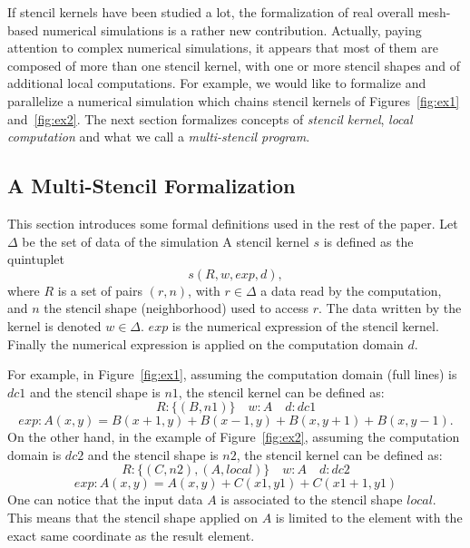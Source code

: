 If stencil kernels have been studied a lot, the formalization of real overall mesh-based numerical simulations is a rather new contribution. Actually, paying attention to complex numerical simulations, it appears that most of them are composed of more than one stencil kernel, with one or more stencil shapes and of additional local computations. For example, we would like to formalize and parallelize a numerical simulation which chains stencil kernels of Figures~\ref{fig:ex1} and~\ref{fig:ex2}. The next section formalizes concepts of \emph{stencil kernel}, \emph{local computation} and what we call a \emph{multi-stencil program}.

\subsection{A Multi-Stencil Formalization}
\label{sect:multistencil}
This section introduces some formal definitions used in the rest of the paper.
Let $\Delta$ be the set of data of the simulation
A stencil kernel $s$ is defined as the quintuplet
\begin{equation} 
s(R,w,exp,d),
\label{eq:st}
\end{equation}
where $R$ is a set of pairs $(r,n)$, with $r \in \Delta$ a data read by the computation, and $n$ the stencil shape (neighborhood) used to access $r$. The data written by the kernel is denoted $w \in \Delta$. $exp$ is the numerical expression of the stencil kernel. Finally the numerical expression is applied on the computation domain $d$.

For example, in Figure~\ref{fig:ex1}, assuming the computation domain (full lines) is $dc1$ and the stencil shape is $n1$, the stencil kernel can be defined as:
\begin{equation*}
R: \{(B,n1)\} \quad w: A \quad d: dc1
\end{equation*}
\begin{equation*}
exp: A(x,y)=B(x+1,y)+B(x-1,y)+B(x,y+1)+B(x,y-1).
\end{equation*}
On the other hand, in the example of Figure~\ref{fig:ex2}, assuming the computation domain is $dc2$ and the stencil shape is $n2$, the stencil kernel can be defined as:
\begin{equation*}
R: \{(C,n2),(A,local)\} \quad w: A \quad d: dc2
\end{equation*}
\begin{equation*}
exp: A(x,y)=A(x,y)+C(x1,y1)+C(x1+1,y1)
\end{equation*}
One can notice that the input data $A$ is associated to the stencil shape $local$. This means that the stencil shape applied on $A$ is limited to the element with the exact same coordinate as the result element.

